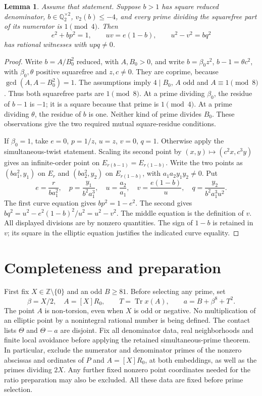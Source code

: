\documentclass[11pt,a4paper]{article}
\newtheorem{lemma}[theorem]{Lemma}
\newcommand{\Q}{\mathbb Q}\newcommand{\Z}{\mathbb Z}
\DeclareMathOperator{\Tr}{Tr}\DeclareMathOperator{\Nm}{Nm}
\begin{document}
\begin{lemma}\label{lem:largepole}
Assume that statement. Suppose $b>1$ has square reduced denominator,
$b\in\Q_2^{\times2}$, $v_2(b)\le-4$, and every prime dividing
the squarefree part of its numerator is $1\pmod4$.
Then
\[
 e^2+bp^2=1,\qquad uv=e(1-b),\qquad u^2-v^2=bq^2
\]
has rational witnesses with $upq\ne0$.
\end{lemma}
\begin{proof}
Write $b=A/B_0^2$ reduced, with $A,B_0>0$, and write
$b=\beta_0 z^2$, $b-1=\theta c^2$, with $\beta_0,\theta$
positive squarefree and $z,c\ne0$. They are coprime, because
$\gcd(A,A-B_0^2)=1$.
The assumptions imply $4\mid B_0$, $A$ odd and $A\equiv1\pmod8$.
Thus both squarefree parts are $1\pmod8$.
At a prime dividing $\beta_0$, the residue of $b-1$ is $-1$;
it is a square because that prime is $1\pmod4$.
At a prime dividing $\theta$, the residue of $b$ is one.
Neither kind of prime divides $B_0$. These observations give the
two required mutual square-residue conditions.

If $\beta_0=1$, take $e=0$, $p=1/z$, $u=z$, $v=0$, $q=1$.
Otherwise apply the simultaneous-twist statement. Scaling its second
point by $(x,y)\mapsto(c^2x,c^3y)$ gives an infinite-order point
on $E_{r(b-1)}=E_{r(1-b)}$. Write the two points as
$(ba_1^2,y_1)$ on $E_r$ and $(ba_2^2,y_2)$ on $E_{r(1-b)}$,
with $a_1a_2y_1y_2\ne0$. Put
\[
 e=\frac{r}{ba_1^2},\quad p=\frac{y_1}{b^2a_1^3},\quad
 u=\frac{a_2}{a_1},\quad v=\frac{e(1-b)}u,\quad
 q=\frac{y_2}{b^2a_1^3u^2}.
\]
The first curve equation gives $bp^2=1-e^2$.
The second gives $bq^2=u^2-e^2(1-b)^2/u^2=u^2-v^2$.
The middle equation is the definition of $v$.
All displayed divisions are by nonzero quantities. The sign of
$1-b$ is retained in $v$; its square in the elliptic equation
justifies the indicated curve equality.
\end{proof}

\section{Completeness and preparation}\label{sec:completeness}
First fix $X\in\Z\setminus\{0\}$ and an odd $B\ge81$.
Before selecting any prime, set
\[
 \beta=X/2,\quad A=[X]R_0,\qquad
 T=\Tr x(A),\qquad a=B+\beta^8+T^2.
\]
The point $A$ is non-torsion, even when $X$ is odd or negative.
No multiplication of an elliptic point by a nonintegral rational
number is being defined.
The contact lists $\Theta$ and $\Theta-a$ are disjoint.
Fix all denominator data, real neighborhoods and finite local
avoidance before applying the retained simultaneous-prime theorem.
In particular, exclude the numerator and denominator primes of the
nonzero abscissas and ordinates of $P$ and $A=[X]R_0$, at both embeddings,
as well as the primes dividing $2X$. Any further fixed nonzero
point coordinates needed for the ratio preparation may also be excluded.
All these data are fixed before prime selection.
\end{document}
